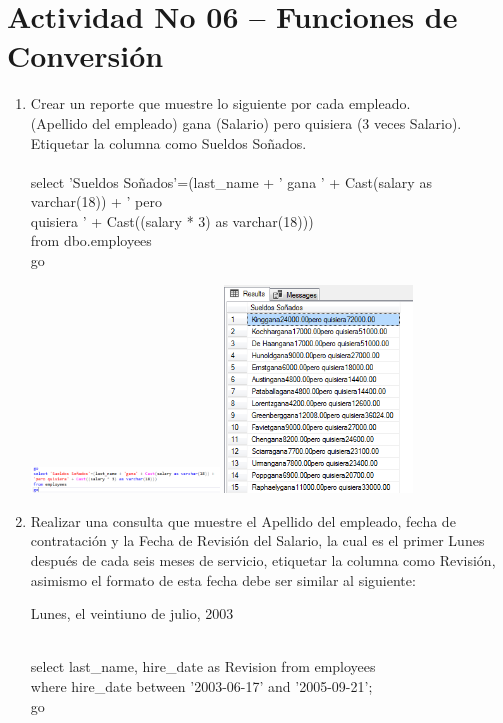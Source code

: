 \section{Actividad No 06 – Funciones de Conversi\'on} 
		
\begin{enumerate}[1.]
	\item Crear un reporte que muestre lo siguiente por cada empleado.
	\\(Apellido del empleado) gana (Salario) pero quisiera (3 veces Salario).
	\\Etiquetar la columna como Sueldos Soñados.
	\\
	\\select 'Sueldos Soñados'=(last\_name + ' gana ' + Cast(salary as varchar(18)) + ' pero 
	\\quisiera ' + Cast((salary * 3) as varchar(18))) 
	\\from dbo.employees
	\\go
	\\
	\begin{center}
	\includegraphics[width=5cm]{./Imagenes/actividad_06_01a}
	\includegraphics[width=5cm]{./Imagenes/actividad_06_01}
	\end{center}

	\item Realizar una consulta que muestre el Apellido del empleado, fecha de contratación y la Fecha de Revisión del Salario, la cual es el primer Lunes después de cada seis meses de servicio, etiquetar la columna como Revisión, asimismo el formato de esta fecha debe ser similar al siguiente: 
	\begin{center}
	Lunes, el veintiuno de julio, 2003 
	\end{center}
\
	\\select last\_name, hire\_date as Revision from employees 
	\\where hire\_date between '2003-06-17' and '2005-09-21';
	\\go
	

\end{enumerate}
